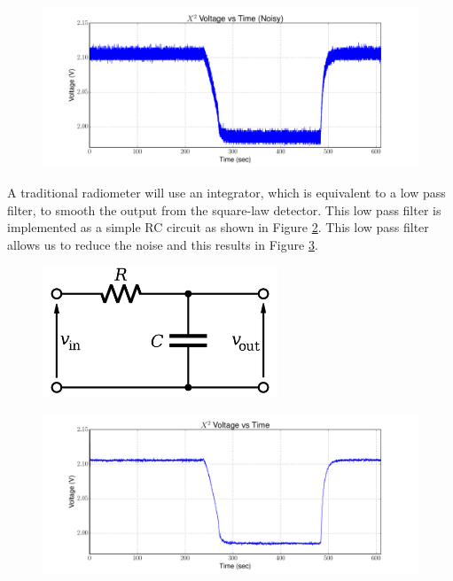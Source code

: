 {\begin{figure}[h!tb] 
\centering
\includegraphics[width=17cm]{Experiments/Exp1/noisy_voltage.pdf}
\label{square_raw}
\end{figure}
}

A traditional radiometer will use an integrator, which is equivalent to a low pass filter, to smooth the output from the square-law detector.  This low pass filter is implemented as a simple RC circuit as shown in Figure \ref{rc_circuit}.  This low pass filter allows us to reduce the noise and this results in Figure \ref{square_raw_filt}.  

{\begin{figure}[h!tb] 
\centering
\includegraphics[width=7cm]{Images/rc_lpf.png}
\label{rc_circuit}
\end{figure}
}

{\begin{figure}[h!tb] 
\centering
\includegraphics[width=17cm]{Experiments/Exp1/x2_filter.pdf}
\label{square_raw_filt}
\end{figure}
}

